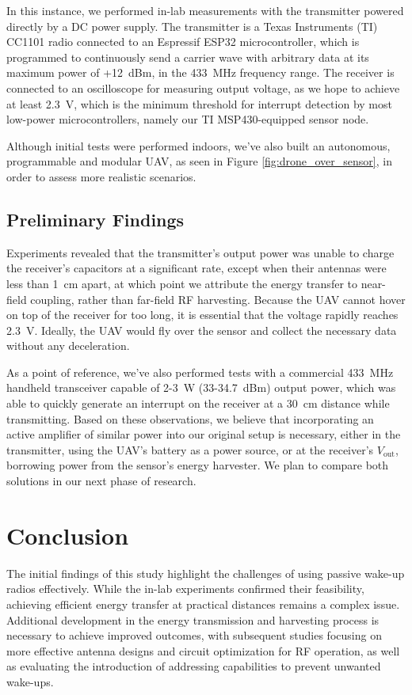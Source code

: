 \documentclass[conference]{IEEEtran}
\begin{document}
In this instance, we performed in-lab measurements with the transmitter powered directly by a DC power supply. The transmitter is a Texas Instruments (TI) CC1101 radio connected to an Espressif ESP32 microcontroller, which is programmed to continuously send a carrier wave with arbitrary data at its maximum power of +12~dBm, in the 433~MHz frequency range. The receiver is connected to an oscilloscope for measuring output voltage, as we hope to achieve at least 2.3~V, which is the minimum threshold for interrupt detection by most low-power microcontrollers, namely our TI MSP430-equipped sensor node.

Although initial tests were performed indoors, we've also built an autonomous, programmable and modular UAV, as seen in Figure \ref{fig:drone_over_sensor}, in order to assess more realistic scenarios.

\subsection{Preliminary Findings}

Experiments revealed that the transmitter's output power was unable to charge the receiver's capacitors at a significant rate, except when their antennas were less than 1~cm apart, at which point we attribute the energy transfer to near-field coupling, rather than far-field RF harvesting. Because the UAV cannot hover on top of the receiver for too long, it is essential that the voltage rapidly reaches 2.3~V. Ideally, the UAV would fly over the sensor and collect the necessary data without any deceleration.

As a point of reference, we've also performed tests with a commercial 433~MHz handheld transceiver capable of 2-3~W (33-34.7~dBm) output power, which was able to quickly generate an interrupt on the receiver at a 30~cm distance while transmitting. Based on these observations, we believe that incorporating an active amplifier of similar power into our original setup is necessary, either in the transmitter, using the UAV's battery as a power source, or at the receiver's $V_{\text{out}}$, borrowing power from the sensor's energy harvester. We plan to compare both solutions in our next phase of research.

\section{Conclusion}

The initial findings of this study highlight the challenges of using passive wake-up radios effectively. While the in-lab experiments confirmed their feasibility, achieving efficient energy transfer at practical distances remains a complex issue. Additional development in the energy transmission and harvesting process is necessary to achieve improved outcomes, with subsequent studies focusing on more effective antenna designs and circuit optimization for RF operation, as well as evaluating the introduction of addressing capabilities to prevent unwanted wake-ups.
\end{document}
